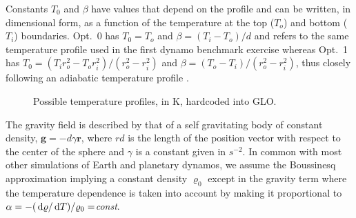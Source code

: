 \documentclass[a4paper,10pt]{book}
\newcommand{\de}{{\rm \, d}}
\renewcommand{\vec}[1]{\mathbf{#1}}
\begin{document}
Constants $T_0$ and $\beta$ have values that depend on the profile and can be
written, in dimensional form, as a function of the temperature at the top
($T_o$) and bottom ($T_i$) boundaries. Opt.~0 has $T_0 = T_o$ and $\beta = (T_i
-T_o)/d$ and refers to the same temperature profile used in the first dynamo
benchmark exercise \citep{ChristensenEtAl01} whereas Opt.~1 has $T_0 = (T_i
r_o^2 - T_o r_i^2)/(r_o^2 - r_i^2)$ and $\beta = (T_o - T_i)/(r_o^2 - r_i^2)$,
thus closely following an adiabatic temperature profile
\citep{LabrossePoirier1997, DaviesGubbins2011}.

\begin{figure}[htb]
\centering
 
 \caption{Possible temperature profiles, in K, hardcoded into GLO.}
\end{figure}

The gravity field is described by that of a self gravitating body of constant
density, $\vec g = - d \gamma \vec r$, where $rd$ is the length of the position
vector with respect to the center of the sphere and $\gamma$ is a constant given
in $s^{-2}$. In common with most other simulations of Earth and planetary
dynamos, we assume the Boussinesq approximation implying a constant density
$\varrho_0$ except in the gravity term where the temperature dependence is taken
into account by making it proportional to $\alpha = - ( \de\varrho/\de
T)/\varrho_0 =${\sl const}.
\end{document}
